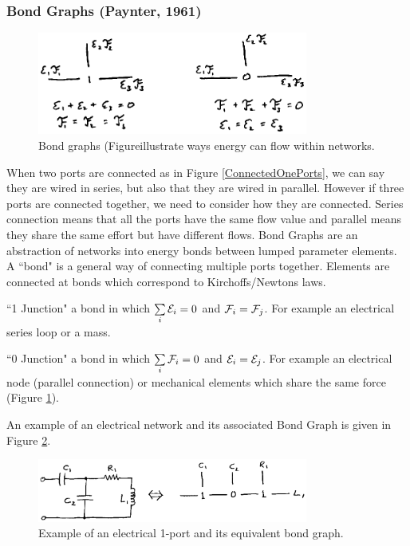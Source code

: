 \subsubsection{Bond Graphs (Paynter, 1961) }


\begin{figure}[h]	%
\centering \includegraphics[width=3.5in]{figs14/00309.eps}
\caption{Bond graphs (Figureillustrate ways energy can flow within networks.}\label{BondGraphs}	%
\end{figure}	%

 When two ports are connected as in Figure \ref{ConnectedOnePorts}, we can say they are wired in series, but also that they are wired in parallel.  However if three ports are connected together, we need to consider how they are connected.  Series connection means that all the ports have the same flow value and parallel means they share the same effort but have different flows.  Bond Graphs are an abstraction of networks into energy bonds between lumped parameter elements. A ``bond" is a general way of connecting multiple ports together.     Elements are connected at bonds which correspond to Kirchoffs/Newtons laws.	%

``1 Junction" a bond in which $\sum\limits_i \mathcal{E}_i = 0$ and $\mathcal{F}_i = \mathcal{F}_j$.  For example an electrical series loop or a mass.

``0 Junction" a bond in which $\sum\limits_i \mathcal{F}_i = 0$ and $\mathcal{E}_i = \mathcal{E}_j$.  For example an electrical node (parallel connection) or   mechanical elements which share the same force (Figure \ref{BondGraphs}).



An example of an electrical network and its associated Bond Graph is given in Figure \ref{CircuitToBond}.	%

%
\begin{figure}[h]	%
\centering \includegraphics[width=3.5in]{figs14/00314.eps}
\caption{Example of an electrical 1-port and its equivalent bond graph.}\label{CircuitToBond}	%
\end{figure}	%


